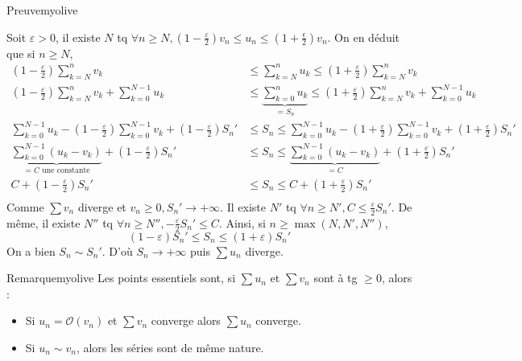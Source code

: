 \begin{demo}{Preuve}{myolive}
\begin{enumerate}
\begin{enumerate}[label=(\alph*)]
                Soit $\varepsilon > 0$, il existe $N$ tq $\forall n \geq N, (1- \frac{\varepsilon}{2}) v_n \leq u_n \leq (1 + \frac{\epsilon}{2})v_n$. On en déduit que si $n \geq N$, 
                \begin{align*}
                    (1- \frac{\varepsilon}{2})\sum_{k=N}^{n} v_k &\leq \sum_{k=N}^{n} u_k \leq (1 + \frac{\varepsilon}{2})\sum_{k=N}^{n} v_k \\
                    (1- \frac{\varepsilon}{2})\sum_{k=N}^{n} v_k + \sum_{k=0}^{N-1} u_k &\leq \underbrace{ \sum_{k=0}^{n} u_k}_{= S_n} \leq (1 + \frac{\varepsilon}{2})\sum_{k=N}^{n} v_k + \sum_{k=0}^{N-1} u_k \\
                    \sum_{k=0}^{N-1} u_k - (1 - \frac{\varepsilon}{2}) \sum_{k=0}^{N-1} v_k + (1 - \frac{\varepsilon}{2})S_n' &\leq S_n \leq \sum_{k=0}^{N-1} u_k - (1 + \frac{\varepsilon}{2}) \sum_{k=0}^{N-1} v_k + (1 + \frac{\varepsilon}{2})S_n'\\
                    \underbrace{\sum_{k=0}^{N-1} (u_k - v_k)}_{=C \text{ une constante}} + (1 - \frac{\varepsilon}{2})S_n' &\leq S_n \leq \underbrace{\sum_{k=0}^{N-1} (u_k - v_k)}_{=C} + (1 + \frac{\varepsilon}{2})S_n' \\
                    C + (1- \frac{\varepsilon}{2})S_n' &\leq S_n \leq C + (1 + \frac{\varepsilon}{2})S_n' \\
                \end{align*}
                Comme $\sum v_n$ diverge et $v_n \geq 0, S_n' \rightarrow +\infty$. Il existe $N'$ tq $\forall n \geq N', C \leq \frac{\varepsilon}{2} S_n'$. De même, il existe $N''$ tq $\forall n \geq N'', -\frac{\varepsilon}{2} S_n' \leq C$. Ainsi, si $n \geq \max(N, N', N'')$,
                \[ (1-\varepsilon) S_n' \leq S_n \leq (1 + \varepsilon) S_n' \] 
                On a bien $S_n \sim S_n'$. D’où $S_n \rightarrow +\infty$ puis $\sum u_n$ diverge.
            \end{enumerate}
        \end{enumerate}
    \end{demo}

    \begin{omed}{Remarque}{myolive}
        Les points essentiels sont, si $\sum u_n$ et $\sum v_n$ sont à tg $\geq 0$, alors : 
        \begin{itemize}
            \item Si $u_n = \mathcal{O}(v_n)$ et $\sum v_n$ converge alors $\sum u_n$ converge.
            \item Si $u_n \sim v_n$, alors les séries sont de même nature.
        \end{itemize}
    \end{omed}

